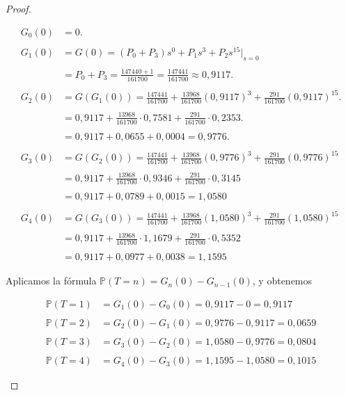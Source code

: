 \documentclass{article}
\begin{document}
\begin{proof}
\begin{itemize}
\begin{align*}
G_0(0) &= 0. \\\\
G_1(0) &= G(0) = (P_0 + P_3)s^0 + P_1 s^3 + P_2 s^{15} \big|_{s=0} \\\\
       &= P_0 + P_3 = \frac{147440 + 1}{161700} = \frac{147441}{161700} \approx 0{,}9117. \\\\
G_2(0) &= G(G_1(0)) = \frac{147441}{161700} + \frac{13968}{161700} (0{,}9117)^3 + \frac{291}{161700} (0{,}9117)^{15}. \\\\
       &= 0{,}9117 + \frac{13968}{161700} \cdot 0{,}7581 + \frac{291}{161700} \cdot 0{,}2353. \\\\
       &= 0{,}9117 + 0{,}0655 + 0{,}0004 = 0{,}9776. \\\\
G_3(0) &= G(G_2(0)) = \frac{147441}{161700} + \frac{13968}{161700} (0{,}9776)^3 + \frac{291}{161700} (0{,}9776)^{15} \\\\
       &= 0{,}9117 + \frac{13968}{161700} \cdot 0{,}9346 + \frac{291}{161700} \cdot 0{,}3145 \\\\
       &= 0{,}9117 + 0{,}0789 + 0{,}0015 = 1{,}0580 \\\\
G_4(0) &= G(G_3(0)) = \frac{147441}{161700} + \frac{13968}{161700} (1{,}0580)^3 + \frac{291}{161700} (1{,}0580)^{15} \\\\
       &= 0{,}9117 + \frac{13968}{161700} \cdot 1{,}1679 + \frac{291}{161700} \cdot 0{,}5352 \\\\
       &= 0{,}9117 + 0{,}0977 + 0{,}0038 = 1{,}1595
\end{align*}

Aplicamos la fórmula \( \mathbb{P}(T = n) = G_n(0) - G_{n-1}(0) \), y obtenemos

\begin{align*}
\mathbb{P}(T = 1) &= G_1(0) - G_0(0) = 0{,}9117 - 0 = 0{,}9117 \\\\
\mathbb{P}(T = 2) &= G_2(0) - G_1(0) = 0{,}9776 - 0{,}9117 = 0{,}0659 \\\\
\mathbb{P}(T = 3) &= G_3(0) - G_2(0) = 1{,}0580 - 0{,}9776 = 0{,}0804 \\\\
\mathbb{P}(T = 4) &= G_4(0) - G_3(0) = 1{,}1595 - 1{,}0580 = 0{,}1015
\end{align*}


\end{itemize}
\end{proof}
\end{document}

